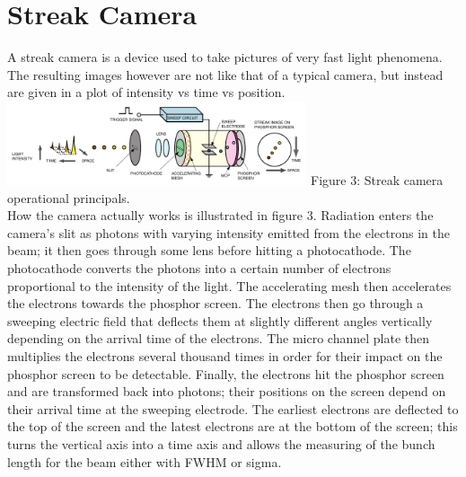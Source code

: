 \documentclass[%
 reprint,%
 amssymb, amsmath,%
 aip,cha,%
]{revtex4-1}
\begin{document}
\section{Streak Camera}
A streak camera is a device used to take pictures of very fast light phenomena. The resulting images however are not like that of a typical camera, but instead are given in a plot of intensity vs time vs position.
\includegraphics[width=250pt]{streakdiagram.pdf}
Figure 3: Streak camera operational principals\cite{Note2}. \\

How the camera actually works is illustrated in figure 3. Radiation enters the camera's slit as photons with varying intensity emitted from the electrons in the beam; it then goes through some lens before hitting a photocathode. The photocathode converts the photons into a certain number of electrons proportional to the intensity of the light. The accelerating mesh then accelerates the electrons towards the phosphor screen. The electrons then go through a sweeping electric field that deflects them at slightly different angles vertically depending on the arrival time of the electrons. The micro channel plate then multiplies the electrons several thousand times in order for their impact on the phosphor screen to be detectable. Finally, the electrons hit the phosphor screen and are transformed back into photons; their positions on the screen depend on their arrival time at the sweeping electrode. The earliest electrons are deflected to the top of the screen and the latest electrons are at the bottom of the screen; this turns the vertical axis into a time axis and allows the measuring of the bunch length for the beam either with FWHM or sigma.
\end{document}
